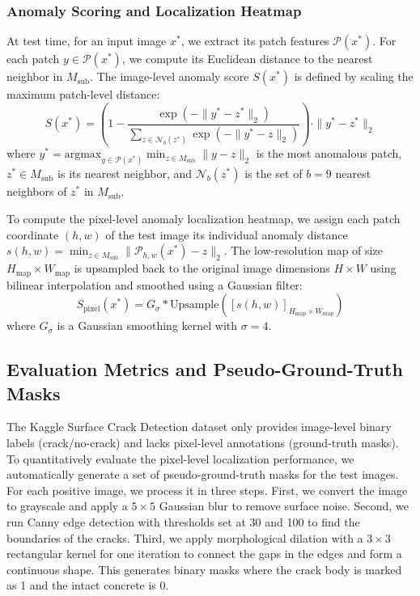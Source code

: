 \documentclass[runningheads]{llncs}
\begin{document}
\subsubsection{Anomaly Scoring and Localization Heatmap}
At test time, for an input image $x^*$, we extract its patch features $\mathcal{P}(x^*)$. For each patch $y \in \mathcal{P}(x^*)$, we compute its Euclidean distance to the nearest neighbor in $M_{\text{sub}}$. The image-level anomaly score $S(x^*)$ is defined by scaling the maximum patch-level distance:
\begin{equation}
S(x^*) = \left( 1 - \frac{\exp(-\|y^* - z^*\|_2)}{\sum_{z \in \mathcal{N}_b(z^*)} \exp(-\|y^* - z\|_2)} \right) \cdot \|y^* - z^*\|_2
\end{equation}
where $y^* = \text{argmax}_{y \in \mathcal{P}(x^*)} \min_{z \in M_{\text{sub}}} \|y - z\|_2$ is the most anomalous patch, $z^* \in M_{\text{sub}}$ is its nearest neighbor, and $\mathcal{N}_b(z^*)$ is the set of $b=9$ nearest neighbors of $z^*$ in $M_{\text{sub}}$.

To compute the pixel-level anomaly localization heatmap, we assign each patch coordinate $(h,w)$ of the test image its individual anomaly distance $s(h,w) = \min_{z \in M_{\text{sub}}} \|\mathcal{P}_{h,w}(x^*) - z\|_2$. The low-resolution map of size $H_{\text{map}} \times W_{\text{map}}$ is upsampled back to the original image dimensions $H \times W$ using bilinear interpolation and smoothed using a Gaussian filter:
\begin{equation}
S_{\text{pixel}}(x^*) = G_{\sigma} * \text{Upsample}\left( [s(h,w)]_{H_{\text{map}} \times W_{\text{map}}} \right)
\end{equation}
where $G_{\sigma}$ is a Gaussian smoothing kernel with $\sigma=4$.

\subsection{Evaluation Metrics and Pseudo-Ground-Truth Masks}
The Kaggle Surface Crack Detection dataset only provides image-level binary labels (crack/no-crack) and lacks pixel-level annotations (ground-truth masks). To quantitatively evaluate the pixel-level localization performance, we automatically generate a set of pseudo-ground-truth masks for the test images. For each positive image, we process it in three steps. First, we convert the image to grayscale and apply a $5 \times 5$ Gaussian blur to remove surface noise. Second, we run Canny edge detection with thresholds set at 30 and 100 to find the boundaries of the cracks. Third, we apply morphological dilation with a $3 \times 3$ rectangular kernel for one iteration to connect the gaps in the edges and form a continuous shape. This generates binary masks where the crack body is marked as 1 and the intact concrete is 0.
\end{document}
